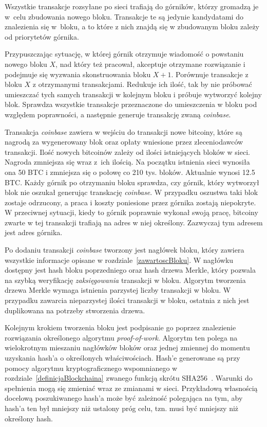 \documentclass[12pt, oneside, final, openany]{mgr}
\begin{document}
\indent Wszystkie transakcje rozsyłane po sieci trafiają do górników, którzy gromadzą je w~celu zbudowania nowego bloku. Transakcje te są jedynie kandydatami do znalezienia się w~bloku, a to które z nich znajdą się w zbudowanym bloku zależy od priorytetów górnika. 

\indent Przypuszczając sytuację, w której górnik otrzymuje wiadomość o powstaniu nowego bloku $X$, nad który też pracował, akceptuje otrzymane rozwiązanie i podejmuje się wyzwania skonstruowania bloku $X+1$. Porównuje transakcje z bloku $X$ z otrzymanymi transakcjami. Redukuje ich ilość, tak by nie próbować umieszczać tych samych transakcji w kolejnym bloku i próbuje wytworzyć kolejny blok. Sprawdza wszystkie transakcje przeznaczone do umieszczenia w bloku pod względem poprawności, a następnie generuje transakcję zwaną \textit{coinbase}. 

\indent Transakcja \textit{coinbase} zawiera w wejściu do transakcji nowe bitcoiny, które są nagrodą za wygenerowany blok oraz opłaty wniesione przez zleceniodawców transakcji. Ilość nowych bitcoinów zależy od ilości istniejących bloków w sieci. Nagroda zmniejsza się wraz z~ich ilością. Na początku istnienia sieci wynosiła ona 50 BTC i zmniejsza się o połowę co 210 tys. bloków. Aktualnie wynosi 12.5 BTC. Każdy górnik po otrzymaniu bloku sprawdza, czy górnik, który wytworzył blok nie oszukał generując transkację \textit{coinbase}. W przypadku oszustwa taki blok zostaje odrzucony, a praca i koszty poniesione przez górnika zostają niepokryte. W przeciwnej sytuacji, kiedy to górnik poprawnie wykonał swoją pracę, bitcoiny zwarte w tej transakcji trafiają na adres w niej określony. Zazwyczaj tym adresem jest adres górnika.

\indent Po dodaniu transakcji \textit{coinbase} tworzony jest nagłówek bloku, który zawiera wszystkie informacje opisane w rozdziale~\ref{zawartoscBloku}. W nagłówku dostępny jest hash bloku poprzedniego oraz hash drzewa Merkle, który pozwala na szybką weryfikację \textit{zaksięgowania} transakcji w bloku. Algorytm tworzenia drzewa Merkle wymaga istnienia parzystej liczby transakcji w bloku. W przypadku zawarcia nieparzystej ilości transakcji w bloku, ostatnia z nich jest duplikowana na potrzeby stworzenia drzewa.

\indent Kolejnym krokiem tworzenia bloku jest podpisanie go poprzez znalezienie rozwiązania określonego algorytmu \textit{proof-of-work}. Algorytm ten polega na wielokrotnym mieszaniu nagłówków bloków oraz jednej zmiennej do momentu uzyskania hash'a o określonych właściwościach. Hash'e generowane są przy pomocy algorytmu kryptograficznego wspomnianego w rozdziale~\ref{definicjaBlockchaina} zwanego funkcją skrótu SHA256~\cite{podstawyKryptografii}. Warunki do spełnienia mogą się zmieniać wraz ze zmianami w sieci. Przykładową własnością docelową poszukiwanego hash'a może być zależność polegająca na tym, aby hash'a ten był mniejszy niż ustalony próg celu, tzn. musi być mniejszy niż określony hash.
\end{document}

